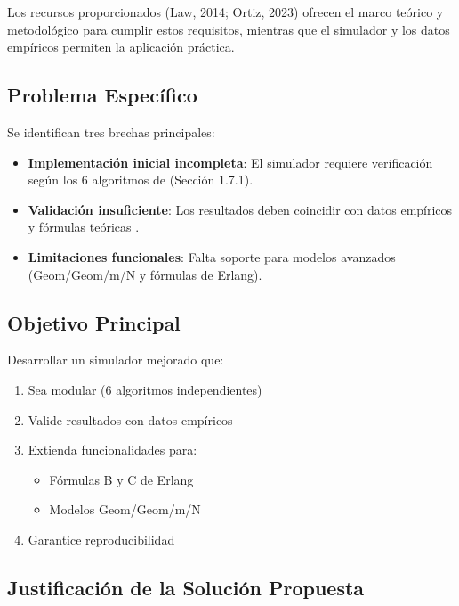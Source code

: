 \documentclass{article}
\begin{document}
Los recursos proporcionados (Law, 2014; Ortiz, 2023) ofrecen el marco teórico y metodológico para cumplir estos requisitos, mientras que el simulador y los datos empíricos permiten la aplicación práctica.

\subsection{Problema Específico}

Se identifican tres brechas principales:

\begin{itemize}
    \item \textbf{Implementación inicial incompleta}: El simulador requiere verificación según los 6 algoritmos de \cite{Ortiz2023} (Sección 1.7.1).
    \item \textbf{Validación insuficiente}: Los resultados deben coincidir con datos empíricos y fórmulas teóricas \cite{Law2014}.
    \item \textbf{Limitaciones funcionales}: Falta soporte para modelos avanzados (Geom/Geom/m/N y fórmulas de Erlang).
\end{itemize}

\subsection{Objetivo Principal}

Desarrollar un simulador mejorado que:
\begin{enumerate}
    \item Sea modular (6 algoritmos independientes)
    \item Valide resultados con datos empíricos
    \item Extienda funcionalidades para:
    \begin{itemize}
        \item Fórmulas B y C de Erlang
        \item Modelos Geom/Geom/m/N
    \end{itemize}
    \item Garantice reproducibilidad
\end{enumerate}


\subsection{Justificación de la Solución Propuesta}
\end{document}
